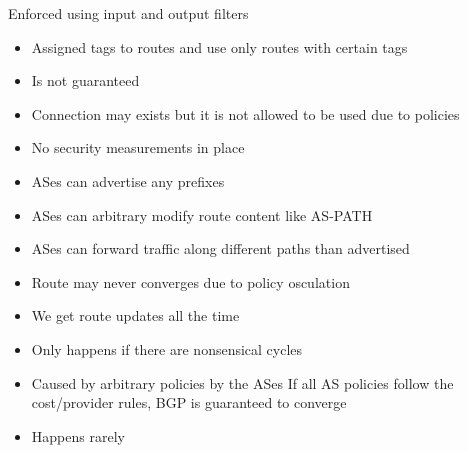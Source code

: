\begin{itemize}
\begin{itemize}
\begin{itemize}
\begin{itemize}
\begin{itemize}
                                \end{itemize}
                             Enforced using input and output filters
                                \begin{itemize}
                                    \item Assigned tags to routes and use only routes with certain tags
                                \end{itemize}
                        \end{itemize}
                \end{itemize}
                \begin{itemize}
                        \begin{itemize}
                            \item Is not guaranteed
                            \item Connection may exists but it is not allowed to be used due to policies
                        \end{itemize}
                        \begin{itemize}
                            \item No security measurements in place
                            \item ASes can advertise any prefixes
                            \item ASes can arbitrary modify route content like AS-PATH
                            \item ASes can forward traffic along different paths than advertised
                        \end{itemize}
                        \begin{itemize}
                            \item Route may never converges due to policy osculation
                            \item We get route updates all the time
                            \item Only happens if there are nonsensical cycles
                            \item Caused by arbitrary policies by the ASes
                                 If all AS policies follow the cost/provider rules, BGP is guaranteed to converge
                            \item Happens rarely

\end{itemize}
\end{itemize}
\end{itemize}
\end{itemize}
